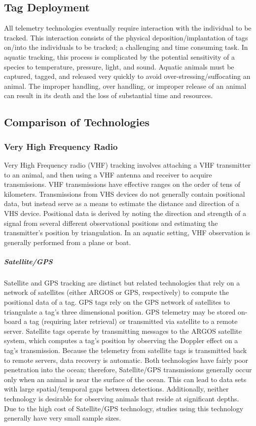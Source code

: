\subsection{Tag Deployment}
All telemetry technologies eventually require interaction with the individual to be tracked.  This interaction consists of the physical deposition/implantation of tags on/into the individuals to be tracked; a challenging and time consuming task.  In aquatic tracking, this process is complicated by the potential sensitivity of a species to temperature, pressure, light, and sound.  Aquatic animals must be captured, tagged, and released very quickly to avoid over-stressing/suffocating an animal.  The improper handling, over handling, or improper release of an animal can result in its death and the loss of substantial time and resources.  

\subsection{Comparison of Technologies}
\subsubsection{Very High Frequency Radio}
Very High Frequency radio (VHF) tracking involves attaching a VHF transmitter to an animal, and then using a VHF antenna and receiver to acquire transmissions.  VHF transmissions have effective ranges on the order of tens of kilometers.  Transmissions from VHS devices do not generally contain positional data, but instead serve as a means to estimate the distance and direction of a VHS device.  Positional data is derived by noting the direction and strength of a signal from several different observational positions and estimating the transmitter's position by triangulation\cite{USDA}.  In an aquatic setting, VHF observation is generally performed from a plane or boat\cite{Wikipedia_RadioTracking}.

\subparagraph{Satellite/GPS}
Satellite and GPS tracking are distinct but related technologies that rely on a network of satellites (either ARGOS or GPS, respectively) to compute the positional data of a tag. GPS tags rely on the GPS network of satellites to triangulate a tag's three dimensional position. GPS telemetry may be stored on-board a tag (requiring later retrieval) or transmitted via satellite to a remote server\cite{USDA}. Satellite tags operate by transmitting messages to the ARGOS satellite system, which computes a tag's position by observing the Doppler effect on a tag's transmission\cite{ARGOS}.  Because the telemetry from satellite tags is transmitted back to remote servers, data recovery is automatic.  Both technologies have fairly poor penetration into the ocean; therefore, Satellite/GPS transmissions generally occur only when an animal is near the surface of the ocean.  This can lead to data sets with large spatial/temporal gaps between detections.  Additionally, neither technology is desirable for observing animals that reside at significant depths.  Due to the high cost of Satellite/GPS technology, studies using this technology generally have very small sample sizes.  

